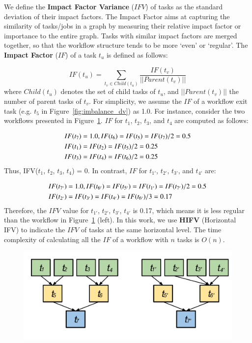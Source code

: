 We define the \textbf{Impact Factor Variance} ($IFV$) of tasks as the standard deviation of their impact factors. The Impact Factor aims at capturing the similarity of tasks/jobs in a graph by measuring their relative impact factor or importance to the entire graph. Tasks with similar impact factors are merged together, so that the workflow structure tends to be more `even' or `regular'. The \textbf{Impact Factor} ($IF$) of a task $t_u$ is defined as follows:

\begin{equation}
\label{eq:imbalance_impact_factor}
	IF(t_u)=\sum_{t_v\in Child(t_u)}^{}\frac{IF(t_v)}{||Parent(t_v)||}
\end{equation}
where $Child(t_u)$ denotes the set of child tasks of $t_u$, and $||Parent(t_v)||$ the number of parent tasks of $t_v$. For simplicity, we assume the $IF$ of a workflow exit task (e.g. $t_5$ in Figure~\ref{fig:imbalance_dv}) as 1.0. For instance, consider the two workflows presented in Figure~\ref{fig:imbalance_hifv}. $IF$ for $t_1$, $t_2$, $t_3$, and $t_4$ are computed as follows:

\begin{eqnarray}
	\displaystyle  
	&IF(t_7 )=1.0, IF(t_6 )=IF(t_5 )=IF(t_7 )/2=0.5\nonumber  \\
	&IF(t_1 )=IF(t_2 )=IF(t_5 )/2=0.25\nonumber \\
	&IF(t_3 )=IF(t_4 )=IF(t_6 )/2=0.25\nonumber 
\end{eqnarray}
Thus, IFV($t_1$, $t_2$, $t_3$, $t_4$) = 0. In contrast, $IF$ for $t_{1'}$, $t_{2'}$, $t_{3'}$, and $t_{4'}$ are:

\begin{eqnarray}
	\displaystyle  
	&IF(t_{7'})=1.0, IF(t_{6'})=IF(t_{5'})=IF(t_{1'})=IF(t_{7'})/2=0.5\nonumber \\
	&IF(t_{2'})=IF(t_{3'})=IF(t_{4'})=IF(t_{6'})/3=0.17 \nonumber
\end{eqnarray}
Therefore, the $IFV$ value for {$t_{1'}$, $t_{2'}$, $t_{3'}$, $t_{4'}$} is 0.17, which means it is less regular than the workflow in Figure~\ref{fig:imbalance_hifv} (left). In this work, we use \textbf{HIFV} (Horizontal IFV) to indicate the $IFV$ of tasks at the same horizontal level. The time complexity of calculating all the $IF$ of a workflow with $n$ tasks is $O(n)$.  

\begin{figure}[htb]
	\centering
	\includegraphics[width=0.85\linewidth]{figures/imbalance/dependency.pdf}
	\label{fig:imbalance_hifv}
\end{figure}

